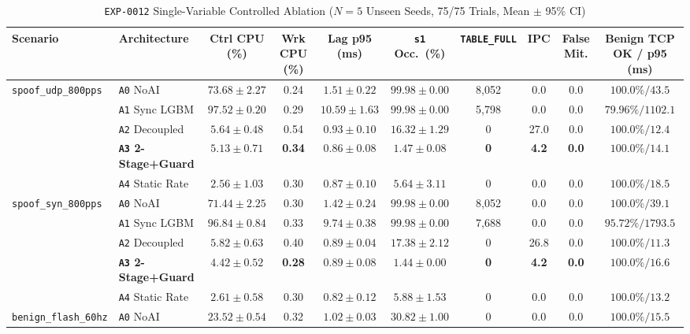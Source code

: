 \documentclass[conference]{IEEEtran}
\begin{document}
\begin{table}[t]
\centering
\caption{\texttt{EXP-0012} Single-Variable Controlled Ablation ($N=5$ Unseen Seeds, 75/75 Trials, Mean $\pm$ 95\% CI)}
\label{tab:exp0012}
\begin{tabular}{llcccccccc}
\toprule
Scenario & Architecture & Ctrl CPU (\%) & Wrk CPU (\%) & Lag p95 (ms) & \texttt{s1} Occ.\ (\%) & \texttt{TABLE\_FULL} & IPC & False Mit. & Benign TCP OK / p95 (ms) \\
\midrule
\multirow{5}{*}{\texttt{spoof\_udp\_800pps}}
 & \texttt{A0} NoAI & $73.68 \pm 2.27$ & 0.24 & $1.51 \pm 0.22$ & $99.98 \pm 0.00$ & 8,052 & 0.0 & 0.0 & $100.0\% / 43.5$ \\
 & \texttt{A1} Sync LGBM & $97.52 \pm 0.20$ & 0.29 & $10.59 \pm 1.63$ & $99.98 \pm 0.00$ & 5,798 & 0.0 & 0.0 & $79.96\% / 1102.1$ \\
 & \texttt{A2} Decoupled & $5.64 \pm 0.48$ & 0.54 & $0.93 \pm 0.10$ & $16.32 \pm 1.29$ & 0 & 27.0 & 0.0 & $100.0\% / 12.4$ \\
 & \textbf{\texttt{A3} 2-Stage+Guard} & $\mathbf{5.13 \pm 0.71}$ & \textbf{0.34} & $\mathbf{0.86 \pm 0.08}$ & $\mathbf{1.47 \pm 0.08}$ & \textbf{0} & \textbf{4.2} & \textbf{0.0} & $\mathbf{100.0\% / 14.1}$ \\
 & \texttt{A4} Static Rate & $2.56 \pm 1.03$ & 0.30 & $0.87 \pm 0.10$ & $5.64 \pm 3.11$ & 0 & 0.0 & 0.0 & $100.0\% / 18.5$ \\
\midrule
\multirow{5}{*}{\texttt{spoof\_syn\_800pps}}
 & \texttt{A0} NoAI & $71.44 \pm 2.25$ & 0.30 & $1.42 \pm 0.24$ & $99.98 \pm 0.00$ & 8,052 & 0.0 & 0.0 & $100.0\% / 39.1$ \\
 & \texttt{A1} Sync LGBM & $96.84 \pm 0.84$ & 0.33 & $9.74 \pm 0.38$ & $99.98 \pm 0.00$ & 7,688 & 0.0 & 0.0 & $95.72\% / 1793.5$ \\
 & \texttt{A2} Decoupled & $5.82 \pm 0.63$ & 0.40 & $0.89 \pm 0.04$ & $17.38 \pm 2.12$ & 0 & 26.8 & 0.0 & $100.0\% / 11.3$ \\
 & \textbf{\texttt{A3} 2-Stage+Guard} & $\mathbf{4.42 \pm 0.52}$ & \textbf{0.28} & $\mathbf{0.89 \pm 0.08}$ & $\mathbf{1.44 \pm 0.00}$ & \textbf{0} & \textbf{4.2} & \textbf{0.0} & $\mathbf{100.0\% / 16.6}$ \\
 & \texttt{A4} Static Rate & $2.61 \pm 0.58$ & 0.30 & $0.82 \pm 0.12$ & $5.88 \pm 1.53$ & 0 & 0.0 & 0.0 & $100.0\% / 13.2$ \\
\midrule
\multirow{5}{*}{\texttt{benign\_flash\_60hz}}
 & \texttt{A0} NoAI & $23.52 \pm 0.54$ & 0.32 & $1.02 \pm 0.03$ & $30.82 \pm 1.00$ & 0 & 0.0 & 0.0 & $100.0\% / 15.5$ \\

\end{tabular}
\end{table}
\end{document}
